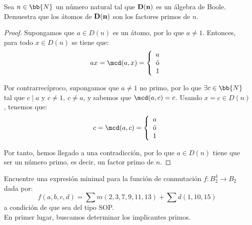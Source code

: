 \begin{ejercicio}
    Sea $n\in \bb{N}$ un número natural tal que $\bf{D}(n)$ es un álgebra de Boole. Demuestra que
    los átomos de $\bf{D}(n)$ son los factores primos de $n$.
    \begin{proof}
        Supongamos que $a\in D(n)$ es un átomo, por lo que $a\neq 1$. Entonces, para todo $x\in D(n)$ se tiene que:
        \begin{equation*}
            ax = \mcd(a,x) = \left\{
                \begin{array}{c}
                    a \\
                    \text{ó} \\
                    1
                \end{array}
            \right.
        \end{equation*}

        Por contrarrecíproco, supongamos que $a\neq 1$ no primo, por lo que $\exists c\in \bb{N}$ tal que $c\mid a$ y $c\neq 1,~c\neq a$,
        y sabemos que $\mcd(a,c)=c$. Usando $x=c\in D(n)$, tenemos que:
        \begin{equation*}
            c = \mcd(a,c) = \left\{
                \begin{array}{c}
                    a \\
                    \text{ó} \\
                    1
                \end{array}
            \right.
        \end{equation*}

        Por tanto, hemos llegado a una contradicción, por lo que $a\in D(n)$ tiene que ser un número primo, es decir, un factor primo de $n$.
    \end{proof}
\end{ejercicio}


\begin{ejercicio}
    Encuentre una expresión minimal para la función de conmutación $f:B_2^4\to B_2$ dada por:
    \begin{equation*}
        f(a,b,c,d)=\sum m(2,3,7,9,11,13) + \sum d(1,10,15)
    \end{equation*}
    a condición de que sea del tipo SOP.\\

    En primer lugar, buscamos determinar los implicantes primos.
\end{ejercicio}


